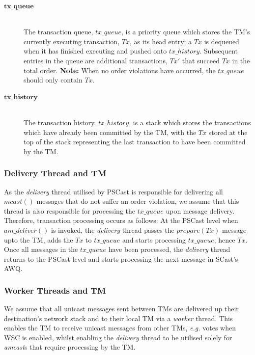\begin{description}
        \item[$\bm{tx\_queue}$] \hfill \\
        The transaction queue, $tx\_queue$, is a priority queue which stores the TM's currently executing transaction, $Tx$, as its head entry; a $Tx$ is dequeued when it has finished executing and pushed onto $tx\_history$.  Subsequent entries in the queue are additional transactions, $Tx'$ that succeed $Tx$ in the total order.  \textbf{Note:} When no order violations have occurred, the $tx\_queue$ should only contain $Tx$.  
        
        \item[$\bm{tx\_history}$] \hfill \\
        The transaction history, $tx\_history$, is a stack which stores the transactions which have already been committed by the TM, with the $Tx$ stored at the top of the stack representing the last transaction to have been committed by the TM.  
    \end{description}
    
    \subsubsection*{Delivery Thread and TM}
    As the \emph{delivery} thread utilised by \textsf{PSCast} is responsible for delivering all $mcast()$ messages that do not suffer an order violation, we assume that this thread is also responsible for processing the $tx\_queue$ upon message delivery.  Therefore, transaction processing occurs as follows: At the \textsf{PSCast} level when $am\_deliver()$ is invoked, the \emph{delivery} thread passes the $prepare(Tx)$ message upto the TM, adds the $Tx$ to $tx\_queue$ and starts processing $tx\_queue$; hence $Tx$.  Once all messages in the $tx\_queue$ have been processed, the \emph{delivery} thread returns to the \textsf{PSCast} level and starts processing the next message in \textsf{SCast}'s AWQ.
    
    \subsubsection*{Worker Threads and TM}
    We assume that all unicast messages sent between TMs are delivered up their destination's network stack and to their local TM via a \emph{worker} thread.  This enables the TM to receive unicast messages from other TMs, \emph{e.g.} votes when WSC is enabled, whilst enabling the \emph{delivery} thread to be utilised solely for \emph{amcast}s that require processing by the TM.  
       

